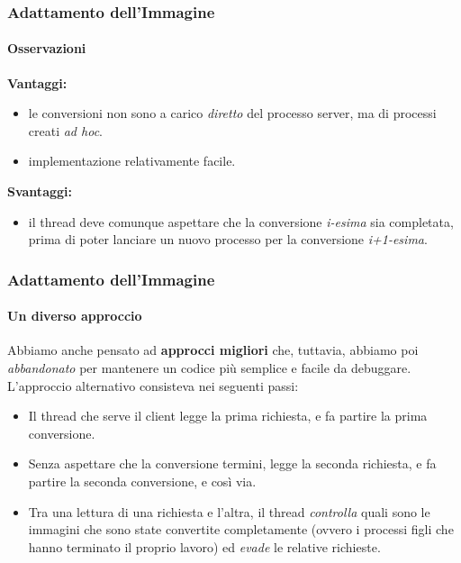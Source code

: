 \documentclass{beamer}
\begin{document}
\begin{frame}
\frametitle{Adattamento dell'Immagine}
\framesubtitle{Osservazioni}

\textbf{Vantaggi:} 
\begin{itemize}
\item le conversioni non sono a carico \textit{diretto} del processo server, ma di processi creati \textit{ad hoc}.
\item implementazione relativamente facile.
\end{itemize}


\medskip

\textbf{Svantaggi:} 
\begin{itemize}
\item il thread deve comunque aspettare che la conversione \textit{i-esima} sia completata, prima di poter lanciare un nuovo processo per la conversione \textit{i+1-esima}.

\end{itemize}
\end{frame}

\begin{frame}
\frametitle{Adattamento dell'Immagine}
\framesubtitle{Un diverso approccio}

Abbiamo anche pensato ad \textbf{approcci migliori} che, tuttavia, abbiamo poi
\textit{abbandonato} per mantenere un codice più semplice e facile da debuggare. L'approccio alternativo consisteva nei seguenti passi:

\begin{itemize}
\item Il thread che serve il client legge la prima richiesta, e fa partire la prima conversione.
\item Senza aspettare che la conversione termini, legge la seconda richiesta, e fa partire la
seconda conversione, e così via.
\item Tra una lettura di una richiesta e l'altra, il thread \textit{controlla} quali sono le immagini che
sono state convertite completamente (ovvero i processi figli che hanno terminato il
proprio lavoro) ed \textit{evade} le relative richieste.
\
\end{itemize}

\end{frame}
\end{document}
